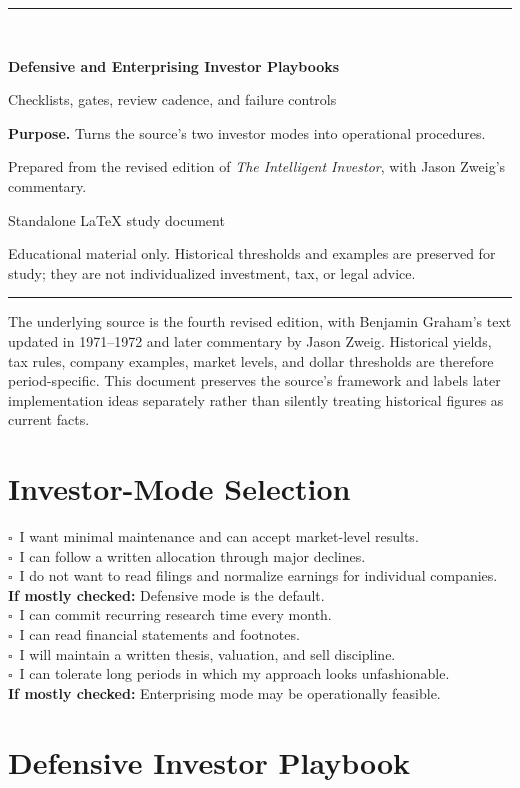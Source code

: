 \documentclass[11pt]{article}
\newcommand{\checkbox}{\(\square\)}
\newcommand{\makedoccover}[4]{%
\hypersetup{pageanchor=false}%
\begin{titlepage}
\thispagestyle{empty}
\vspace*{1.0in}
{\color{Navy}\rule{\linewidth}{2.2pt}}\\[0.55in]
{\Huge\bfseries\color{Navy} #1\par}
\vspace{0.18in}
{\Large\color{Teal} #2\par}
\vspace{0.5in}
\begin{tcolorbox}[colback=LightGray,colframe=Gray,boxrule=0.5pt,arc=2mm]
\textbf{Purpose.} #3
\end{tcolorbox}
\vfill
{\large Prepared from the revised edition of \textit{The Intelligent Investor}, with Jason Zweig's commentary.\par}
\vspace{0.12in}
{\small #4\par}
\vspace{0.25in}
{\small\color{Gray}\parbox{0.90\textwidth}{\centering Educational material only. Historical thresholds and examples are preserved for study; they are not individualized investment, tax, or legal advice.}}\par
\vspace{0.35in}
{\color{Navy}\rule{\linewidth}{2.2pt}}
\end{titlepage}\hypersetup{pageanchor=true}
}
\begin{document}
\makedoccover{Defensive and Enterprising Investor Playbooks}{Checklists, gates, review cadence, and failure controls}{Turns the source's two investor modes into operational procedures.}{Standalone LaTeX study document}
\tableofcontents\newpage

\begin{cautionbox}
The underlying source is the fourth revised edition, with Benjamin Graham's text updated in 1971--1972 and later commentary by Jason Zweig. Historical yields, tax rules, company examples, market levels, and dollar thresholds are therefore period-specific. This document preserves the source's framework and labels later implementation ideas separately rather than silently treating historical figures as current facts.
\end{cautionbox}

\section{Investor-Mode Selection}
\begin{worksheetbox}
\checkbox\ I want minimal maintenance and can accept market-level results.\\
\checkbox\ I can follow a written allocation through major declines.\\
\checkbox\ I do not want to read filings and normalize earnings for individual companies.\\
\textbf{If mostly checked:} Defensive mode is the default.\\[4pt]
\checkbox\ I can commit recurring research time every month.\\
\checkbox\ I can read financial statements and footnotes.\\
\checkbox\ I will maintain a written thesis, valuation, and sell discipline.\\
\checkbox\ I can tolerate long periods in which my approach looks unfashionable.\\
\textbf{If mostly checked:} Enterprising mode may be operationally feasible.
\end{worksheetbox}

\section{Defensive Investor Playbook}
\end{document}
